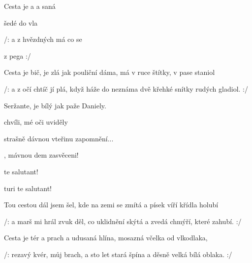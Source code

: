 

\zs
Cesta je  a  a saná 

 šedé   do vla

/: a z hvězdných  má  co  se 

  z  pega :/
\ks

\zs
Cesta je bič, je zlá jak pouliční dáma,
má v ruce štítky, v pase staniol

/: a z očí chtíč jí plá, když háže do neznáma
dvě křehké snítky rudých gladiol. :/
\ks

\zr
Seržante,  je bílý jak paže Daniely.

 chvíli, mé oči uviděly

 strašně dávnou vteřinu zapomnění...

, mávnou dem zasvěceni!

 te salutant!

turi te salutant!
\kr

\zr
Tou cestou dál jsem šel, kde na zemi se zmítá
a písek víří křídla holubí

/: a marš mi hrál zvuk děl,
co uklidnění skýtá a zvedá chmýří, které zahubí. :/
\kr

\zr
Cesta je tér a prach a udusaná hlína,
mosazná včelka od vlkodlaka,

/: rezavý kvér, můj brach, a sto let stará špína
a děsně velká bílá oblaka. :/
\kr

\zr   \kr

\kp
